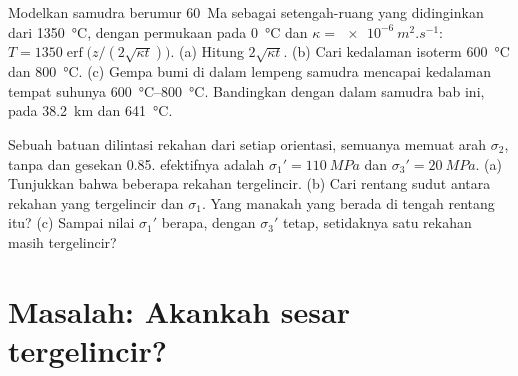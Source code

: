\begin{exercise}[$\star\star\star$]\label{exo:b1:stress-strain-rheology:11}
Modelkan  samudra berumur \qty{60}{Ma} sebagai setengah-ruang yang didinginkan dari \qty{1350}{\degreeCelsius}, dengan permukaan pada \qty{0}{\degreeCelsius} dan $\kappa = \qty{e-6}{m^2.s^{-1}}$: $T = \num{1350}\operatorname{erf}\bigl(z/(2\sqrt{\kappa t})\bigr)$. (a) Hitung $2\sqrt{\kappa t}$. (b) Cari kedalaman isoterm \qty{600}{\degreeCelsius} dan \qty{800}{\degreeCelsius}. (c) Gempa bumi di dalam lempeng samudra mencapai kedalaman tempat suhunya \qtyrange{600}{800}{\degreeCelsius}. Bandingkan dengan  dalam  samudra bab ini, pada \qty{38.2}{km} dan \qty{641}{\degreeCelsius}.
\end{exercise}

\begin{exercise}[$\star\star\star$]\label{exo:b1:stress-strain-rheology:12}
Sebuah batuan dilintasi rekahan dari setiap orientasi, semuanya memuat arah $\sigma_2$, tanpa  dan gesekan 0.85.  efektifnya adalah $\sigma_1' = \qty{110}{MPa}$ dan $\sigma_3' = \qty{20}{MPa}$. (a) Tunjukkan bahwa beberapa rekahan tergelincir. (b) Cari rentang sudut antara rekahan yang tergelincir dan $\sigma_1$. Yang manakah yang berada di tengah rentang itu? (c) Sampai nilai $\sigma_1'$ berapa, dengan $\sigma_3'$ tetap, setidaknya satu rekahan masih tergelincir?
\end{exercise}

\section{Masalah: Akankah sesar tergelincir?}

